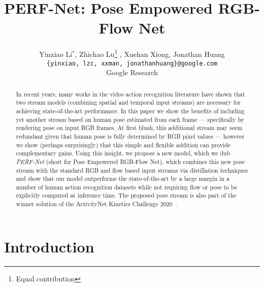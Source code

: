 \documentclass[10pt,twocolumn,letterpaper]{article}
\begin{document}
\title{PERF-Net: Pose Empowered RGB-Flow Net}




\author{
Yinxiao Li$^\ast$, Zhichao Lu\thanks{Equal contribution} , Xuehan Xiong, Jonathan Huang \\
{\tt\small  {\{yinxiao, lzc, xxman, jonathanhuang\}@google.com}} \\
Google Research \\
}

\maketitle

\ifwacvfinal
\thispagestyle{empty}

\begin{abstract}





In recent years, many works in the video action recognition literature have shown that two stream models (combining spatial and temporal input streams) are necessary for achieving state-of-the-art performance. In this paper we show the benefits of including yet another stream based on human pose estimated from each frame --- specifically by rendering pose on input RGB frames. At first blush, this additional stream may seem redundant given that human pose is fully determined by RGB pixel values --- however we show (perhaps surprisingly) that this simple and flexible addition can provide complementary gains. Using this insight, we propose a new model, which we dub \emph{PERF-Net} (short for Pose Empowered RGB-Flow Net), which combines this new pose stream with the standard RGB and flow based input streams via distillation techniques and show that our model outperforms the state-of-the-art by a large margin in a number of human action recognition datasets while not requiring flow or pose to be explicitly computed at inference time. The proposed pose stream is also part of the winner solution of the ActivityNet Kinetics Challenge 2020~\cite{activitynet2020}.

\vspace{-0.5cm}
\end{abstract}


\section{Introduction}\label{sec:intro}
\end{document}
